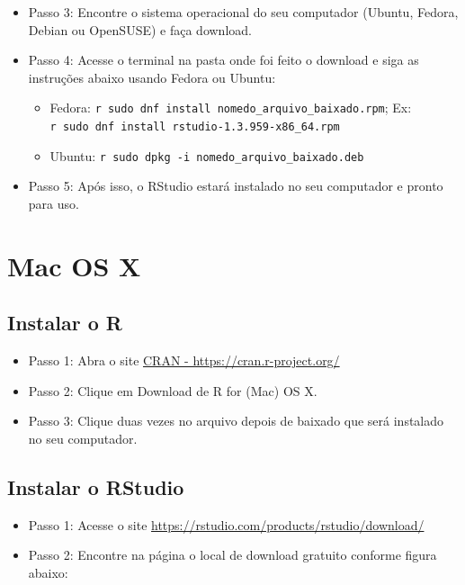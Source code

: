 \documentclass[
]{book}
\providecommand{\tightlist}{%
  \setlength{\itemsep}{0pt}\setlength{\parskip}{0pt}}
\begin{document}
\begin{itemize}
\tightlist
\item
  Passo 3: Encontre o sistema operacional do seu computador (Ubuntu, Fedora, Debian ou OpenSUSE) e faça download.\\
\item
  Passo 4: Acesse o terminal na pasta onde foi feito o download e siga as instruções abaixo usando Fedora ou Ubuntu:

  \begin{itemize}
  \tightlist
  \item
    Fedora: \texttt{r\ sudo\ dnf\ install\ nomedo\_arquivo\_baixado.rpm}; Ex: \texttt{r\ sudo\ dnf\ install\ rstudio-1.3.959-x86\_64.rpm}
  \item
    Ubuntu: \texttt{r\ sudo\ dpkg\ -i\ nomedo\_arquivo\_baixado.deb}\\
  \end{itemize}
\item
  Passo 5: Após isso, o RStudio estará instalado no seu computador e pronto para uso.
\end{itemize}

\hypertarget{mac-os-x}{%
\section{Mac OS X}\label{mac-os-x}}

\hypertarget{instalar-o-r-1}{%
\subsection{Instalar o R}\label{instalar-o-r-1}}

\begin{itemize}
\tightlist
\item
  Passo 1: Abra o site \href{https://cran.r-project.org/}{CRAN - https://cran.r-project.org/}
\item
  Passo 2: Clique em Download de R for (Mac) OS X.\\
\item
  Passo 3: Clique duas vezes no arquivo depois de baixado que será instalado no seu computador.
\end{itemize}

\hypertarget{instalar-o-rstudio-1}{%
\subsection{Instalar o RStudio}\label{instalar-o-rstudio-1}}

\begin{itemize}
\tightlist
\item
  Passo 1: Acesse o site \url{https://rstudio.com/products/rstudio/download/}\\
\item
  Passo 2: Encontre na página o local de download gratuito conforme figura abaixo:
\end{itemize}
\end{document}
